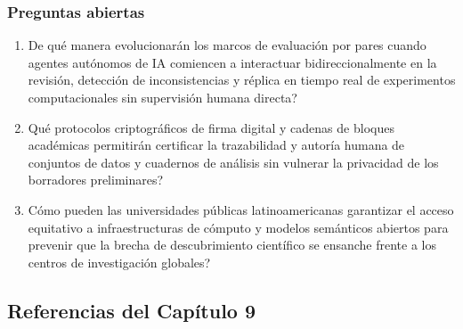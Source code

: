 \subsubsection*{Preguntas abiertas}
\begin{enumerate}[label=\arabic*., leftmargin=2em, itemsep=0.08cm, topsep=0.08cm, parsep=0pt]
    \item \textquestiondown De qué manera evolucionarán los marcos de evaluación por pares cuando agentes autónomos de IA comiencen a interactuar bidireccionalmente en la revisión, detección de inconsistencias y réplica en tiempo real de experimentos computacionales sin supervisión humana directa?
    \item \textquestiondown Qué protocolos criptográficos de firma digital y cadenas de bloques académicas permitirán certificar la trazabilidad y autoría humana de conjuntos de datos y cuadernos de análisis sin vulnerar la privacidad de los borradores preliminares?
    \item \textquestiondown Cómo pueden las universidades públicas latinoamericanas garantizar el acceso equitativo a infraestructuras de cómputo y modelos semánticos abiertos para prevenir que la brecha de descubrimiento científico se ensanche frente a los centros de investigación globales?
\end{enumerate}

\newpage
{}
\subsection*{Referencias del Capítulo 9}

